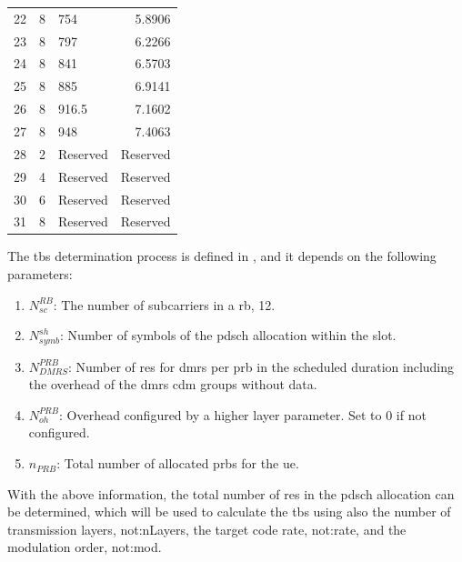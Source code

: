 \begin{table}[tb]
\begin{tabularx}{0.85\columnwidth}{l X X r}
  22 &  8   & 754       &  5.8906 \\
  23 &  8   & 797       &  6.2266 \\
  24 &  8   & 841       &  6.5703 \\
  25 &  8   & 885       &  6.9141 \\
  26 &  8   & 916.5     &  7.1602 \\
  27 &  8   & 948       &  7.4063 \\
  28 &  2   & Reserved  & Reserved \\
  29 &  4   & Reserved  & Reserved \\
  30 &  6   & Reserved  & Reserved \\
  31 &  8   & Reserved  & Reserved \\
  \bottomrule
\end{tabularx}
\end{table}

The \gls{tbs} determination process is defined in \cite[Section 5.1.3.2]{3gpp.38.214}, and it depends on the following parameters:

\begin{enumerate}
    \item $N_{sc}^{RB}$: The number of subcarriers in a \gls{rb}, 12.
    \item $N_{symb}^{sh}$: Number of symbols of the \gls{pdsch} allocation within the slot.
    \item $N_{DMRS}^{PRB}$: Number of \glspl{re} for \gls{dmrs} per \gls{prb} in the scheduled duration including the overhead of the \gls{dmrs} \gls{cdm} groups without data.
    \item $N_{oh}^{PRB}$: Overhead configured by a higher layer parameter. Set to 0 if not configured.
    \item $n_{PRB}$: Total number of allocated \glspl{prb} for the \gls{ue}.
\end{enumerate}

With the above information, the total number of \glspl{re} in the \gls{pdsch} allocation can be determined, which will be used to calculate the \gls{tbs} using also the number of transmission layers, \gls{not:nLayers}, the target code rate, \gls{not:rate}, and the modulation order, \gls{not:mod}. 


